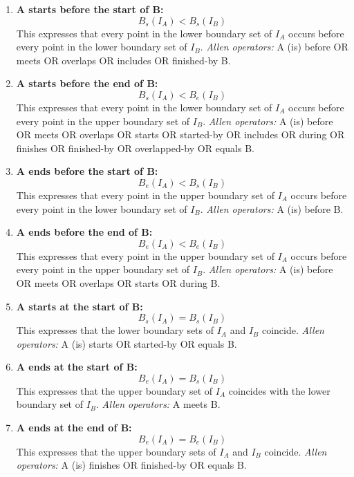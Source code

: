 \begin{enumerate}
    \item \textbf{A starts before the start of B:}  
    \[
    B_s(I_A) < B_s(I_B)
    \]
    This expresses that every point in the lower boundary set of \( I_A \) occurs before every point in the lower boundary set of \( I_B \).  
    \textit{Allen operators:} A (is) before OR meets OR overlaps OR includes OR finished-by B.

    \item \textbf{A starts before the end of B:}  
    \[
    B_s(I_A) < B_e(I_B)
    \]
    This expresses that every point in the lower boundary set of \( I_A \) occurs before every point in the upper boundary set of \( I_B \).  
    \textit{Allen operators:} A (is) before OR meets OR overlaps OR starts OR started-by OR includes OR during OR finishes OR finished-by OR overlapped-by OR equals B.

    \item \textbf{A ends before the start of B:}  
    \[
    B_e(I_A) < B_s(I_B)
    \]
    This expresses that every point in the upper boundary set of \( I_A \) occurs before every point in the lower boundary set of \( I_B \).  
    \textit{Allen operators:} A (is) before B.

    \item \textbf{A ends before the end of B:}  
    \[
    B_e(I_A) < B_e(I_B)
    \]
    This expresses that every point in the upper boundary set of \( I_A \) occurs before every point in the upper boundary set of \( I_B \).  
    \textit{Allen operators:} A (is) before OR meets OR overlaps OR starts OR during B.

    \item \textbf{A starts at the start of B:}  
    \[
    B_s(I_A) = B_s(I_B)
    \]
    This expresses that the lower boundary sets of \( I_A \) and \( I_B \) coincide.  
    \textit{Allen operators:} A (is) starts OR started-by OR equals B.

    \item \textbf{A ends at the start of B:}  
    \[
    B_e(I_A) = B_s(I_B)
    \]
    This expresses that the upper boundary set of \( I_A \) coincides with the lower boundary set of \( I_B \).  
    \textit{Allen operators:} A meets B.

    \item \textbf{A ends at the end of B:}  
    \[
    B_e(I_A) = B_e(I_B)
    \]
    This expresses that the upper boundary sets of \( I_A \) and \( I_B \) coincide.  
    \textit{Allen operators:} A (is) finishes OR finished-by OR equals B.
\end{enumerate}

